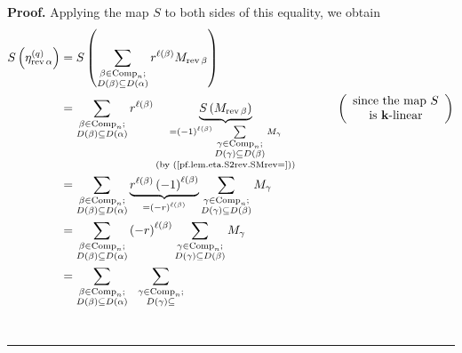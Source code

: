 \documentclass[numbers=enddot,12pt,final,onecolumn,notitlepage]{scrartcl}%
\theoremstyle{definition}
\newenvironment{proof}[1][Proof]{\noindent\textbf{#1.} }{\ \rule{0.5em}{0.5em}}
\let\sumnonlimits\sum
\renewcommand{\sum}{\sumnonlimits\limits}
\newenvironment{verlong}{}{}
\begin{document}
\begin{verlong}
\begin{proof}
Applying the map $S$ to both sides of this equality, we obtain%
\begin{align}
S\left(  \eta_{\operatorname*{rev}\alpha}^{\left(  q\right)  }\right)   &
=S\left(  \sum_{\substack{\beta\in\operatorname*{Comp}\nolimits_{n};\\D\left(
\beta\right)  \subseteq D\left(  \alpha\right)  }}r^{\ell\left(  \beta\right)
}M_{\operatorname*{rev}\beta}\right) \nonumber\\
&  =\sum_{\substack{\beta\in\operatorname*{Comp}\nolimits_{n};\\D\left(
\beta\right)  \subseteq D\left(  \alpha\right)  }}r^{\ell\left(  \beta\right)
}\underbrace{S\left(  M_{\operatorname*{rev}\beta}\right)  }%
_{\substack{=\left(  -1\right)  ^{\ell\left(  \beta\right)  }\sum
_{\substack{\gamma\in\operatorname*{Comp}\nolimits_{n};\\D\left(
\gamma\right)  \subseteq D\left(  \beta\right)  }}M_{\gamma}\\\text{(by
(\ref{pf.lem.eta.S2rev.SMrev=}))}}}\ \ \ \ \ \ \ \ \ \ \left(
\begin{array}
[c]{c}%
\text{since the map }S\\
\text{is }\mathbf{k}\text{-linear}%
\end{array}
\right) \nonumber\\
&  =\sum_{\substack{\beta\in\operatorname*{Comp}\nolimits_{n};\\D\left(
\beta\right)  \subseteq D\left(  \alpha\right)  }}\underbrace{r^{\ell\left(
\beta\right)  }\left(  -1\right)  ^{\ell\left(  \beta\right)  }}_{=\left(
-r\right)  ^{\ell\left(  \beta\right)  }}\sum_{\substack{\gamma\in
\operatorname*{Comp}\nolimits_{n};\\D\left(  \gamma\right)  \subseteq D\left(
\beta\right)  }}M_{\gamma}\nonumber\\
&  =\sum_{\substack{\beta\in\operatorname*{Comp}\nolimits_{n};\\D\left(
\beta\right)  \subseteq D\left(  \alpha\right)  }}\left(  -r\right)
^{\ell\left(  \beta\right)  }\sum_{\substack{\gamma\in\operatorname*{Comp}%
\nolimits_{n};\\D\left(  \gamma\right)  \subseteq D\left(  \beta\right)
}}M_{\gamma}\nonumber\\
&  =\sum_{\substack{\beta\in\operatorname*{Comp}\nolimits_{n};\\D\left(
\beta\right)  \subseteq D\left(  \alpha\right)  }}\ \ \sum_{\substack{\gamma
\in\operatorname*{Comp}\nolimits_{n};\\D\left(  \gamma\right)  \subseteq
}}
\end{align}
\end{proof}
\end{verlong}
\end{document}

